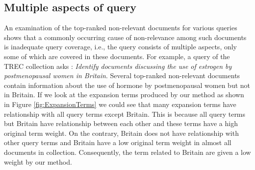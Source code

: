 \subsection{Multiple aspects of query}
An examination of the top-ranked non-relevant documents for various queries shows that a commonly occurring cause of non-relevance among such  documents is inadequate query coverage, i.e., the query consists of multiple aspects, only some of which are covered in these documents. 
For example, a query  of the TREC collection asks : {\it Identify documents discussing the use of estrogen by postmenopausal women in Britain}. Several top-ranked non-relevant documents contain information about the use of hormone by postmenopausal women but not in Britain. If we look at the expansion terms produced by our method as shown in Figure \ref{fig:ExpansionTerms} 
 we could see that many expansion terms have relationship with all query terms except Britain. This is because all query terms but Britain have relationship between each other and these terms have a high original term weight. On the contrary, Britain does not have relationship with other query terms and Britain have a low original term weight in almost all documents in collection. Consequently, the term related to Britain are given a low weight by our method. 

\begin{figure*}[htbp]
\begin{center}
\caption{Expansion terms}
\label{fig:ExpansionTerms}
\end{center}
\end{figure*}

